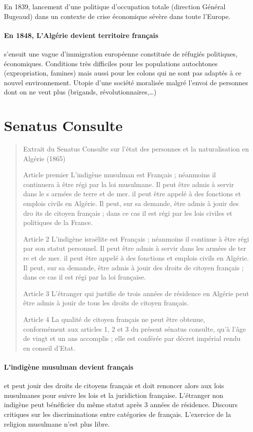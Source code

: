 En 1839, lancement d’une politique d’occupation totale (direction Général Bugeaud) dans un contexte de crise économique sévère dans toute l’Europe.

\paragraph{En 1848, L’Algérie devient territoire français}
  s’ensuit une vague d’immigration européenne constituée de réfugiés politiques, économiques. Conditions très difficiles pour les populations autochtones (expropriation, famines) mais aussi pour les colons qui ne sont pas adaptés à ce nouvel environnement.
Utopie d’une société moralisée malgré l’envoi de personnes dont on ne veut plus (brigands, révolutionnaires,…)


\section{Senatus Consulte}

\begin{quote}
    Extrait du
Senatus Consulte sur l’état des
personnes et la naturalisation en Algérie (1865)
 
Article premier
L'indigène musulman est Français ; néanmoins il continuera à être régi par la loi musulmane. Il peut être admis à servir dans
le s armées de terre et
de mer. il peut être appelé à des fonctions et emplois civils en Algérie. Il peut, sur sa demande, être admis à jouir des dro its de citoyen français ; dans
ce cas il est régi par les lois civiles et politiques de la France.
 
Article 2
L'indigène
israëlite est Français ; néanmoins il continue à être régi par son statut personnel. Il peut être admis à servir dans les armées de ter re et de
mer. il peut être appelé à des fonctions et emplois civils en Algérie. Il peut, sur sa demande, être admis à jouir des droits de citoyen français ; dans ce
cas il est régi par la loi française.
 
Article 3
L'étranger qui justifie de trois années de résidence en Algérie peut être admis à jouir de tous les droits de citoyen français.
 
Article 4
La qualité de citoyen français ne peut être obtenue, conformément aux articles 1, 2 et 3 du présent sénatus
consulte, qu'à l'âge de vingt et un ans
accomplis ; elle est conférée par décret impérial rendu en conseil d'Etat.
\end{quote}
\paragraph{L’indigène musulman devient français}
 et peut jouir des droits de citoyens français et doit renoncer alors aux lois musulmanes pour suivre les lois et la juridiction française. L’étranger non indigène peut bénéficier du même statut après 3 années de résidence.
Discours critiques sur les discriminations entre catégories de français. L’exercice de la religion musulmane n’est plus libre.

